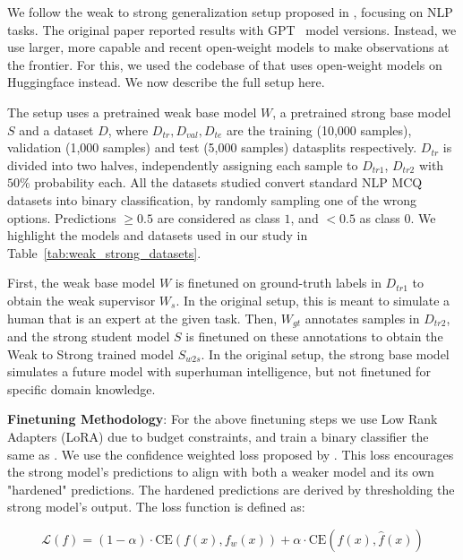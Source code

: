 We follow the weak to strong generalization setup proposed in \citet{burns2024weaktostrong}, focusing on NLP tasks. The original paper reported results with GPT~\citep{radford2019language} model versions. Instead, we use larger, more capable and recent open-weight models to make observations at the frontier. For this, we used the codebase of \citet{scherlis2024w2seleuther} that uses open-weight models on Huggingface instead. We now describe the full setup here.

The setup uses a pretrained weak base model $W$, a pretrained strong base model $S$ and a dataset $D$, where $D_{tr}, D_{val}, D_{te}$ are the training (10,000 samples), validation (1,000 samples) and test (5,000 samples) datasplits respectively. $D_{tr}$ is divided into two halves, independently assigning each sample to $D_{tr1}$, $D_{tr2}$ with $50\%$ probability each. All the datasets studied convert standard NLP MCQ datasets into binary classification, by randomly sampling one of the wrong options. Predictions $\geq 0.5$ are considered as class $1$, and $< 0.5$ as class 0. We highlight the models and datasets used in our study in Table~\ref{tab:weak_strong_datasets}.

First, the weak base model $W$ is finetuned on ground-truth labels in $D_{tr1}$ to obtain the weak supervisor $W_{s}$. In the original setup, this is meant to simulate a human that is an expert at the given task. Then, $W_{gt}$ annotates samples in $D_{tr2}$, and the strong student model $S$ is finetuned on these annotations to obtain the Weak to Strong trained model $S_{w2s}$. In the original setup, the strong base model simulates a future model with superhuman intelligence, but not finetuned for specific domain knowledge. 

\textbf{Finetuning Methodology}: For the above finetuning steps we use Low Rank Adapters (LoRA) \citep{hu2021lora} due to budget constraints, and train a binary classifier the same as \citet{scherlis2024w2seleuther}. We use the confidence weighted loss proposed by \citet{burns2024weaktostrong}. This loss encourages the strong model's predictions to align with both a weaker model and its own "hardened" predictions. The hardened predictions are derived by thresholding the strong model's output. The loss function is defined as:

\begin{equation}
\label{eq:conf_loss_appendix}
\mathcal{L}(f) = (1-\alpha) \cdot \text{CE}(f(x), f_w(x)) + \alpha \cdot \text{CE}(f(x), \hat{f}(x))
\end{equation}


